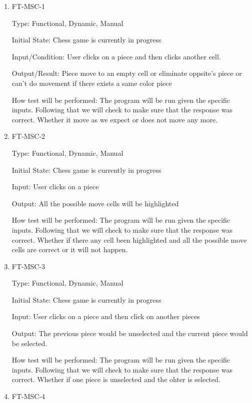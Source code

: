 \documentclass[12pt, titlepage]{article}
\begin{document}
\begin{enumerate}

\item{FT-MSC-1\\}

Type: Functional, Dynamic, Manual
					
Initial State: Chess game is currently in progress
					
Input/Condition: User clicks on a piece and then clicks another cell.
					
Output/Result: Piece move to an empty cell or eliminate oppsite's piece or can't do movement if there exists a same color piece
					
How test will be performed: The program will be run given the specific inputs. Following that we will check to make sure that the response was correct. Whether it move as we expect or does not move any more. 
					
\item{FT-MSC-2\\}

Type: Functional, Dynamic, Manual
					
Initial State: Chess game is currently in progress
					
Input: User clicks on a piece
					
Output: All the possible move cells will be highlighted
					
How test will be performed: The program will be run given the specific inputs. Following that we will check to make sure that the response was correct. Whether if there any cell been highlighted and all the possible move cells are correct or it will not happen.

\item{FT-MSC-3\\}

Type: Functional, Dynamic, Manual
					
Initial State: Chess game is currently in progress
					
Input: User clicks on a piece and then click on another pieces 
					
Output: The previous piece would be unselected and the current piece would be selected. 
					
How test will be performed: The program will be run given the specific inputs. Following that we will check to make sure that the response was correct. Whether if one piece is unselected and the ohter is selected.

\item{FT-MSC-4\\}


\end{enumerate}
\end{document}
